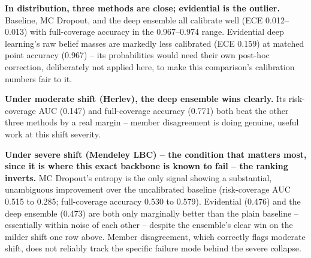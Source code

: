 \documentclass[runningheads]{llncs}
\begin{document}
\textbf{In distribution, three methods are close; evidential is the
outlier.} Baseline, MC Dropout, and the deep ensemble all calibrate well
(ECE 0.012--0.013) with full-coverage accuracy in the 0.967--0.974 range.
Evidential deep learning's raw belief masses are markedly less calibrated
(ECE 0.159) at matched point accuracy (0.967) -- its probabilities would
need their own post-hoc correction, deliberately not applied here, to
make this comparison's calibration numbers fair to it.

\textbf{Under moderate shift (Herlev), the deep ensemble wins clearly.}
Its risk-coverage AUC (0.147) and full-coverage accuracy (0.771) both beat
the other three methods by a real margin -- member disagreement is doing
genuine, useful work at this shift severity.

\textbf{Under severe shift (Mendeley LBC) -- the condition that matters
most, since it is where this exact backbone is known to fail -- the
ranking inverts.} MC Dropout's entropy is the only signal showing a
substantial, unambiguous improvement over the uncalibrated baseline
(risk-coverage AUC 0.515 to 0.285; full-coverage accuracy 0.530 to 0.579).
Evidential (0.476) and the deep ensemble (0.473) are both only marginally
better than the plain baseline -- essentially within noise of each other
-- despite the ensemble's clear win on the milder shift one row above.
Member disagreement, which correctly flags moderate shift, does not
reliably track the specific failure mode behind the severe collapse.
\end{document}
